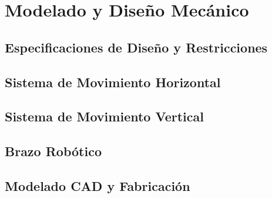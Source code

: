 \documentclass[a4paper,12pt]{report}
\begin{document}
\section{Modelado y Diseño Mecánico}

\subsection{Especificaciones de Diseño y Restricciones}


%
%
%

%
\subsection{Sistema de Movimiento Horizontal}


%

\subsection{Sistema de Movimiento Vertical}


%

\subsection{Brazo Robótico}

%


\subsection{Modelado CAD y Fabricación}
%

%
\end{document}
